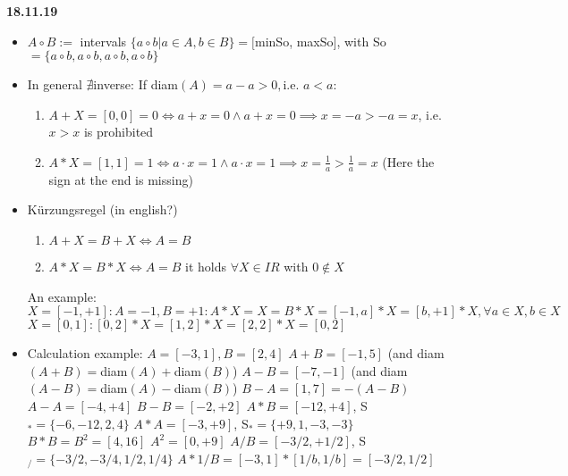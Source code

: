 \documentclass[a4paper, 11pt]{report}
\theoremstyle{break}
\theoremstyle{proofstyle}
\begin{document}
\newline \textbf{18.11.19}
\begin{itemize}
    \item $A\circ B:=$ intervals $\{a\circ b| a\in A, b\in B\}=[$minSo, maxSo$]$, with So$=\{a\circ b,a\circ b,a\circ b,a\circ b\}$
    \item In general $\nexists $inverse:
    \newline If diam$(A)=a-a>0, $i.e. $a<a$:
    \begin{enumerate}
        \item $A+X=[0,0]=0 \iff a+x=0 \land a+x=0 \implies x=-a>-a=x$, i.e. $x>x$ is prohibited
        \item $A*X=[1,1]=1 \iff a\cdot x=1 \land a\cdot x=1 \implies x=\frac{1}{a}>\frac{1}{a}=x$ (Here the sign at the end is missing)
    \end{enumerate}
    \item Kürzungsregel (in english?)
    \begin{enumerate}
        \item $A+X=B+X \iff A=B$
        \item $A*X=B*X \iff A=B$ it holds $\forall X\in IR$ with $0\not \in X$
    \end{enumerate}
    \newline An example:
    \newline $X=[-1,+1]: A=-1,B=+1: A*X=X=B*X=[-1,a]*X=[b,+1]*X, \forall a\in X, b\in X$
    \newline $X=[0,1]: [0,2]*X=[1,2]*X=[2,2]*X=[0,2]$
    \item Calculation example:
    \newline $A=[-3,1], B=[2,4]$
    \newline $A+B=[-1,5]$ (and diam$(A+B)=$diam$(A)+$diam$(B)$)
    \newline $A-B=[-7,-1]$ (and diam$(A-B)=$diam$(A)-$diam$(B)$)
    \newline $B-A=[1,7]=-(A-B)$
    \newline $A-A=[-4,+4]$
    \newline $B-B=[-2,+2]$
    \newline $A*B=[-12,+4]$, S$_*=\{-6,-12,2,4\}$
    \newline $A*A=[-3,+9]$, S$_*=\{+9,1,-3,-3\}$
    \newline $B*B=B^2=[4,16]$
    \newline $A^2=[0,+9]$
    \newline $A/B=[-3/2,+1/2]$, S$_/=\{-3/2,-3/4,1/2,1/4\}$
    \newline $A*1/B=[-3,1]*[1/b,1/b]=[-3/2,1/2]$

\end{itemize}
\end{document}
